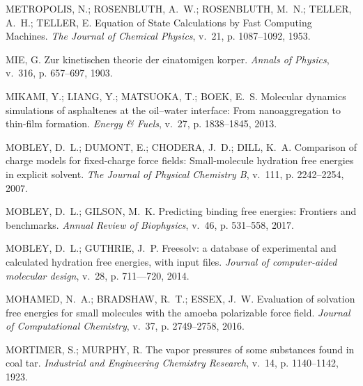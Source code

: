 \documentclass[
	12pt,				%
	openany,			%
	oneside,			%
	a4paper,			%
	english,			%
	brazil				%
	]{abntex2}
\begin{document}
\begin{thebibliography}{}
{METROPOLIS, N.; ROSENBLUTH, A.~W.; ROSENBLUTH, M.~N.; TELLER, A.~H.; TELLER,
  E. {Equation of State Calculations by Fast Computing Machines}.
\emph{The Journal of Chemical Physics}, v.~21, p. 1087--1092, 1953.}

{MIE, G. Zur kinetischen theorie der einatomigen korper.
\emph{Annals of Physics}, v.~316, p. 657--697, 1903.}

{MIKAMI, Y.; LIANG, Y.; MATSUOKA, T.; BOEK, E.~S. Molecular dynamics
  simulations of asphaltenes at the oil–water interface: From nanoaggregation
  to thin-film formation.
\emph{Energy \& Fuels}, v.~27, p. 1838--1845, 2013.}

{MOBLEY, D.~L.; DUMONT, E.; CHODERA, J.~D.; DILL, K.~A. Comparison of charge
  models for fixed-charge force fields: Small-molecule hydration free energies
  in explicit solvent.
\emph{The Journal of Physical Chemistry B}, v.~111, p. 2242--2254, 2007.}

{MOBLEY, D.~L.; GILSON, M.~K. Predicting binding free energies: Frontiers and
  benchmarks.
\emph{Annual Review of Biophysics}, v.~46, p. 531--558, 2017.}

{MOBLEY, D.~L.; GUTHRIE, J.~P. Freesolv: a database of experimental and
  calculated hydration free energies, with input files.
\emph{Journal of computer-aided molecular design}, v.~28, p. 711—720, 2014.}

{MOHAMED, N.~A.; BRADSHAW, R.~T.; ESSEX, J.~W. Evaluation of solvation free
  energies for small molecules with the amoeba polarizable force field.
\emph{Journal of Computational Chemistry}, v.~37, p. 2749--2758, 2016.}

{MORTIMER, S.; MURPHY, R. The vapor pressures of some substances found in coal
  tar.
\emph{Industrial and Engineering Chemistry Research}, v.~14, p. 1140--1142,
  1923.}


\end{thebibliography}
\end{document}
